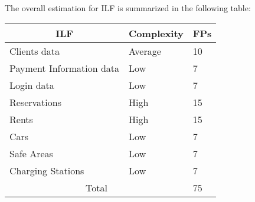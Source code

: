 The overall estimation for ILF is summarized in the following table:
\begin{center}
\begin{tabular}{|l l l|}
\hline
\multicolumn{1}{|c}{ILF}&Complexity&FPs\\
\hline
Clients data & Average & 10\\
Payment Information data & Low & 7\\
Login data &Low&7\\
Reservations & High & 15\\
Rents & High&15\\
Cars & Low & 7\\
Safe Areas & Low& 7 \\
Charging Stations & Low & 7\\\hline
\multicolumn{2}{|c}{Total}&75\\
\hline
\end{tabular}
\end{center}
\newpage

